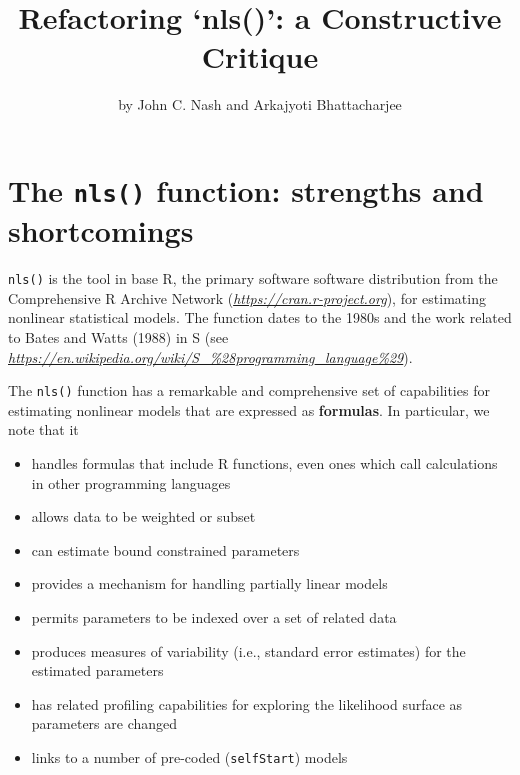 \title{Refactoring `nls()': a Constructive Critique}
\author{by John C. Nash and Arkajyoti Bhattacharjee}

\maketitle


\hypertarget{the-nls-function-strengths-and-shortcomings}{%
\section{\texorpdfstring{The \texttt{nls()} function: strengths and shortcomings}{The nls() function: strengths and shortcomings}}\label{the-nls-function-strengths-and-shortcomings}}

\texttt{nls()} is the tool in base R, the primary software software distribution
from the Comprehensive R Archive Network (\emph{\url{https://cran.r-project.org}}),
for estimating nonlinear statistical models. The function dates to the 1980s and
the work related to Bates and Watts (1988) in S (see \emph{\url{https://en.wikipedia.org/wiki/S_\%28programming_language\%29}}).

The \texttt{nls()} function has a remarkable and comprehensive set of capabilities for
estimating nonlinear models that are expressed as \textbf{formulas}. In particular, we note that it

\begin{itemize}
\tightlist
\item
  handles formulas that include R functions, even ones which call calculations in
  other programming languages
\item
  allows data to be weighted or subset
\item
  can estimate bound constrained parameters
\item
  provides a mechanism for handling partially linear models
\item
  permits parameters to be indexed over a set of related data
\item
  produces measures of variability (i.e., standard error estimates) for the
  estimated parameters
\item
  has related profiling capabilities for exploring the likelihood surface as
  parameters are changed
\item
  links to a number of pre-coded (\texttt{selfStart}) models
\end{itemize}

